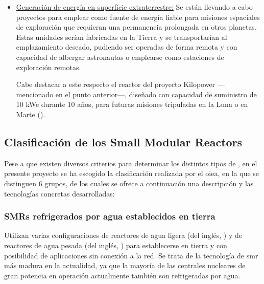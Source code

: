 \begin{itemize}
  \item \underline{Generación de energía en superfície extraterrestre:} Se están llevando a cabo proyectos para emplear  como fuente de energía fiable para misiones espaciales de exploración que requieran una permanencia prolongada en otros planetas. Estas unidades serían fabricadas en la Tierra y se transportarían al emplazamiento deseado, pudiendo ser operadas de forma remota y con capacidad de albergar astronautas o emplearse como estaciones de exploración remotas.
  
  Cabe destacar a este respecto el reactor del proyecto Kilopower ---mencionado en el punto anterior---, diseñado con capacidad de suministro de 10 kWe durante 10 años, para futuras misiones tripuladas en la Luna o en Marte (\cite{nasa_fission_surface_power}).
  
\end{itemize}

\subsection{Clasificación de los Small Modular Reactors}

Pese a que existen diversos criterios para determinar los distintos tipos de , en el presente proyecto se ha escogido la clasificación realizada por el \acrshort{oiea}, en la que se distinguen 6 grupos, de los cuales se ofrece a continuación una descripción y las tecnologías concretas desarrolladas:

\subsubsection{SMRs refrigerados por agua establecidos en tierra}

 Utilizan varias configuraciones de reactores de agua ligera (del inglés, ) y de reactores de agua pesada (del inglés, ) para establecerse en tierra y con posibilidad de aplicaciones sin conexión a la red. Se trata de la tecnología de \acrshort{smr} más madura en la actualidad, ya que la mayoría de las centrales nucleares de gran potencia en operación actualmente también son refrigeradas por agua.

